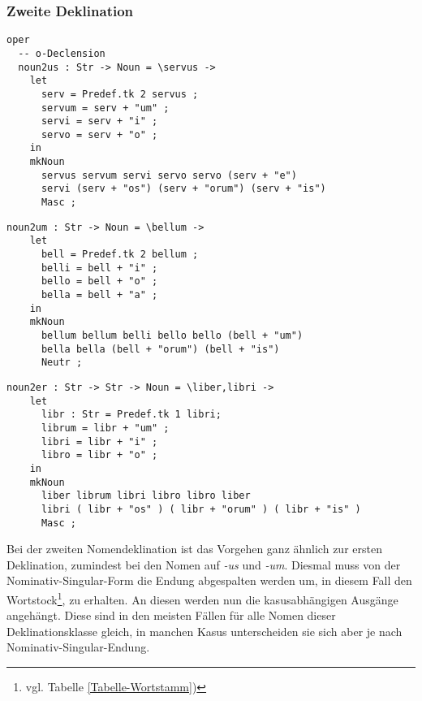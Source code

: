 \subsubsection{Zweite Deklination}
\begin{lstlisting}[float=h!tp,caption={Die Deklinationsfunktionen für die Nomen der zweiten Deklination auf \textit{-us} (vgl. \textbf{MorphoLat.gf})},label={GF-Morpho-Noun2us},basicstyle=\small]
oper
  -- o-Declension
  noun2us : Str -> Noun = \servus ->
    let
      serv = Predef.tk 2 servus ;
      servum = serv + "um" ;
      servi = serv + "i" ;
      servo = serv + "o" ;
    in
    mkNoun 
      servus servum servi servo servo (serv + "e")
      servi (serv + "os") (serv + "orum") (serv + "is")
      Masc ;
\end{lstlisting}
\begin{lstlisting}[float=h!tp,caption={Die Deklinationsfunktionen für die Nomen der zweiten Deklination auf \textit{-um} (vgl. \textbf{MorphoLat.gf})},label={GF-Morpho-Noun2um},basicstyle=\small]
  noun2um : Str -> Noun = \bellum ->
    let
      bell = Predef.tk 2 bellum ;
      belli = bell + "i" ;
      bello = bell + "o" ;
      bella = bell + "a" ;
    in
    mkNoun 
      bellum bellum belli bello bello (bell + "um")
      bella bella (bell + "orum") (bell + "is")
      Neutr ;
\end{lstlisting}
\begin{lstlisting}[float=h!tp,caption={Die Deklinationsfunktionen für die Nomen der zweiten Deklination auf \textit{-er} (vgl. \textbf{MorphoLat.gf})},label={GF-Morpho-Noun2er},basicstyle=\small]
  noun2er : Str -> Str -> Noun = \liber,libri ->
    let
      libr : Str = Predef.tk 1 libri;
      librum = libr + "um" ;
      libri = libr + "i" ;
      libro = libr + "o" ;
    in
    mkNoun 
      liber librum libri libro libro liber
      libri ( libr + "os" ) ( libr + "orum" ) ( libr + "is" )
      Masc ;
\end{lstlisting}
Bei der zweiten Nomendeklination ist das Vorgehen ganz ähnlich zur ersten Deklination, zumindest bei den Nomen auf \textit{-us} und \textit{-um}. Diesmal muss von der Nominativ-Singular-Form die Endung abgespalten werden um, in diesem Fall den Wortstock\footnote{vgl. Tabelle \ref{Tabelle-Wortstamm})}, zu erhalten. An diesen werden nun die kasusabhängigen Ausgänge angehängt. Diese sind in den meisten Fällen für alle Nomen dieser Deklinationsklasse gleich, in manchen Kasus unterscheiden sie sich aber je nach Nominativ-Singular-Endung. \par

